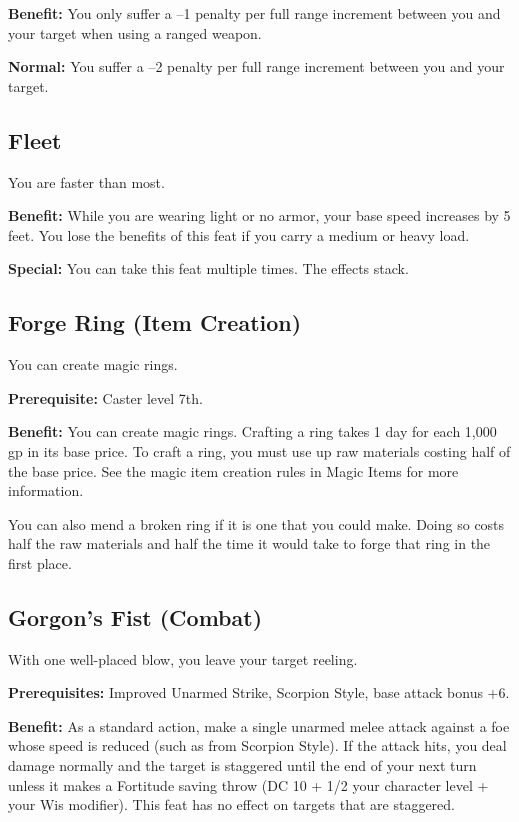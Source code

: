 \textbf{Benefit:} You only suffer a --1 penalty per full range increment between you and your target when using a ranged weapon.
				
\textbf{Normal:} You suffer a --2 penalty per full range increment between you and your target.
				
\subsection{Fleet}

				
You are faster than most.
				
\textbf{Benefit:} While you are wearing light or no armor, your base speed increases by 5 feet. You lose the benefits of this feat if you carry a medium or heavy load.
				
\textbf{Special:} You can take this feat multiple times. The effects stack. 
				
\subsection{Forge Ring (Item Creation)}

				
You can create magic rings.
				
\textbf{Prerequisite:} Caster level 7th.
				
\textbf{Benefit:} You can create magic rings. Crafting a ring takes 1 day for each 1,000 gp in its base price. To craft a ring, you must use up raw materials costing half of the base price. See the magic item creation rules in Magic Items for more information.

You can also mend a broken ring if it is one that you could make. Doing so costs half the raw materials and half the time it would take to forge that ring in the first place.
				
\subsection{Gorgon's Fist (Combat)}

				
With one well-placed blow, you leave your target reeling.
				
\textbf{Prerequisites:} Improved Unarmed Strike, Scorpion Style, base attack bonus +6.
				
\textbf{Benefit:} As a standard action, make a single unarmed melee attack against a foe whose speed is reduced (such as from Scorpion Style). If the attack hits, you deal damage normally and the target is staggered until the end of your next turn unless it makes a Fortitude saving throw (DC 10 + 1/2 your character level + your Wis modifier). This feat has no effect on targets that are staggered.
				
